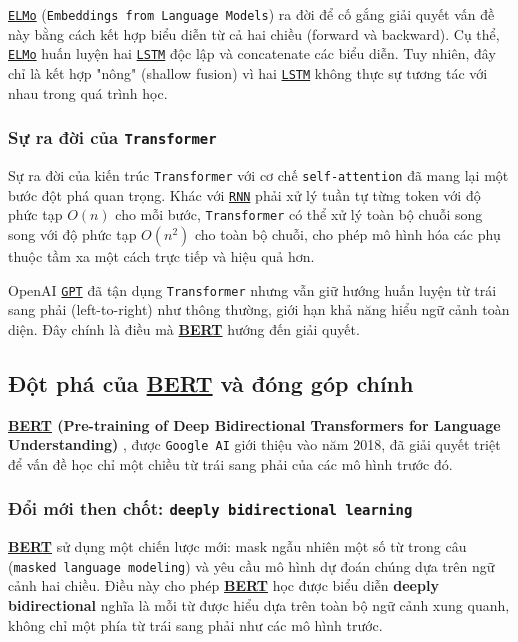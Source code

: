 \hyperref[acro:elmo]{\texttt{ELMo}} (\texttt{Embeddings from Language Models}) \cite{peters2018deep} ra đời để cố gắng giải quyết vấn đề này bằng cách kết hợp biểu diễn từ cả hai chiều (forward và backward). Cụ thể, \hyperref[acro:elmo]{\texttt{ELMo}} huấn luyện hai \hyperref[acro:lstm]{\texttt{LSTM}} độc lập và concatenate các biểu diễn. Tuy nhiên, đây chỉ là kết hợp "nông" (shallow fusion) vì hai \hyperref[acro:lstm]{\texttt{LSTM}} không thực sự tương tác với nhau trong quá trình học.

\subsubsection{Sự ra đời của \texttt{Transformer}}
Sự ra đời của kiến trúc \texttt{Transformer} \cite{vaswani2017attention} với cơ chế \texttt{self-attention} đã mang lại một bước đột phá quan trọng. Khác với \hyperref[acro:rnn]{\texttt{RNN}} phải xử lý tuần tự từng token với độ phức tạp $O(n)$ cho mỗi bước, \texttt{Transformer} có thể xử lý toàn bộ chuỗi song song với độ phức tạp $O(n^2)$ cho toàn bộ chuỗi, cho phép mô hình hóa các phụ thuộc tầm xa một cách trực tiếp và hiệu quả hơn.

OpenAI \hyperref[acro:gpt]{\texttt{GPT}} \cite{radford2018improving} đã tận dụng \texttt{Transformer} nhưng vẫn giữ hướng huấn luyện từ trái sang phải (left-to-right) như thông thường, giới hạn khả năng hiểu ngữ cảnh toàn diện. Đây chính là điều mà \hyperref[acro:bert]{\textbf{BERT}} hướng đến giải quyết.

\subsection{Đột phá của \hyperref[acro:bert]{\textbf{BERT}} và đóng góp chính}
\label{ssec:muc_tieu_dong_gop_bert}

\textbf{\hyperref[acro:bert]{\textbf{BERT}} (Pre-training of Deep Bidirectional Transformers for Language Understanding)} \cite{devlin2018bert}, được \texttt{Google AI} giới thiệu vào năm 2018, đã giải quyết triệt để vấn đề học chỉ một chiều từ trái sang phải của các mô hình trước đó. 

\subsubsection{Đổi mới then chốt: \texttt{deeply bidirectional learning}}
\hyperref[acro:bert]{\textbf{BERT}} sử dụng một chiến lược mới: mask ngẫu nhiên một số từ trong câu (\texttt{masked language modeling}) và yêu cầu mô hình dự đoán chúng dựa trên ngữ cảnh hai chiều. Điều này cho phép \hyperref[acro:bert]{\textbf{BERT}} học được biểu diễn \textbf{deeply bidirectional} nghĩa là mỗi từ được hiểu dựa trên toàn bộ ngữ cảnh xung quanh, không chỉ một phía từ trái sang phải như các mô hình trước.

